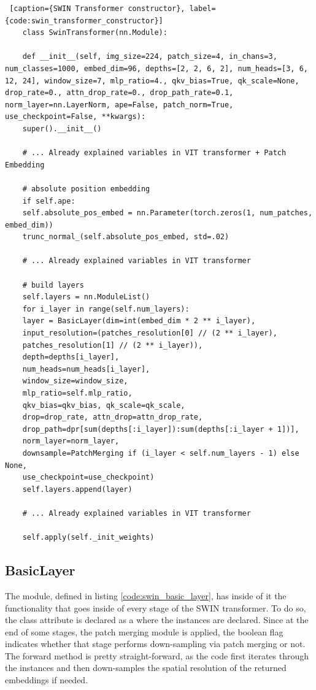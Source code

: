 \begin{lstlisting} [caption={SWIN Transformer constructor}, label={code:swin_transformer_constructor}]
	class SwinTransformer(nn.Module):
	
	def __init__(self, img_size=224, patch_size=4, in_chans=3, num_classes=1000, embed_dim=96, depths=[2, 2, 6, 2], num_heads=[3, 6, 12, 24], window_size=7, mlp_ratio=4., qkv_bias=True, qk_scale=None, drop_rate=0., attn_drop_rate=0., drop_path_rate=0.1,	norm_layer=nn.LayerNorm, ape=False, patch_norm=True, use_checkpoint=False, **kwargs):
	super().__init__()
	
	# ... Already explained variables in VIT transformer + Patch Embedding
	
	# absolute position embedding
	if self.ape:
	self.absolute_pos_embed = nn.Parameter(torch.zeros(1, num_patches, embed_dim))
	trunc_normal_(self.absolute_pos_embed, std=.02)
	
	# ... Already explained variables in VIT transformer
	
	# build layers
	self.layers = nn.ModuleList()
	for i_layer in range(self.num_layers):
	layer = BasicLayer(dim=int(embed_dim * 2 ** i_layer),
	input_resolution=(patches_resolution[0] // (2 ** i_layer),
	patches_resolution[1] // (2 ** i_layer)),
	depth=depths[i_layer],
	num_heads=num_heads[i_layer],
	window_size=window_size,
	mlp_ratio=self.mlp_ratio,
	qkv_bias=qkv_bias, qk_scale=qk_scale,
	drop=drop_rate, attn_drop=attn_drop_rate,
	drop_path=dpr[sum(depths[:i_layer]):sum(depths[:i_layer + 1])],
	norm_layer=norm_layer,
	downsample=PatchMerging if (i_layer < self.num_layers - 1) else None,
	use_checkpoint=use_checkpoint)
	self.layers.append(layer)
	
	# ... Already explained variables in VIT transformer
	
	self.apply(self._init_weights)
\end{lstlisting}

\subsection{BasicLayer}
The  module, defined in listing \ref{code:swin_basic_layer}, has inside of it the functionality that goes inside of every stage of the SWIN transformer. To do so, the class attribute  is declared as a  where the  instances are declared. Since at the end of some stages, the patch merging module is applied, the  boolean flag indicates whether that stage performs down-sampling via patch merging or not. The forward method is pretty straight-forward, as the code first iterates through the   instances and then down-samples the spatial resolution of the returned embeddings if needed.

